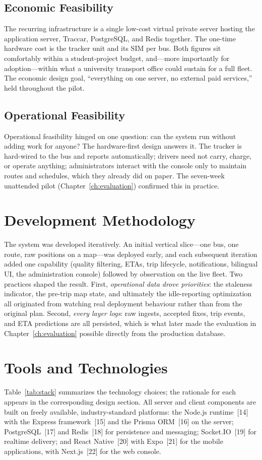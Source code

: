 \subsection{Economic Feasibility}
The recurring infrastructure is a single low-cost virtual private server
hosting the application server, Traccar, PostgreSQL, and Redis together.
The one-time hardware cost is the tracker unit and its SIM per bus. Both
figures sit comfortably within a student-project budget, and---more
importantly for adoption---within what a university transport office
could sustain for a full fleet. The economic design goal, ``everything on
one server, no external paid services,'' held throughout the pilot.

\subsection{Operational Feasibility}
Operational feasibility hinged on one question: can the system run
without adding work for anyone? The hardware-first design answers it. The
tracker is hard-wired to the bus and reports automatically; drivers need
not carry, charge, or operate anything; administrators interact with the
console only to maintain routes and schedules, which they already did on
paper. The seven-week unattended pilot (Chapter~\ref{ch:evaluation})
confirmed this in practice.

\section{Development Methodology}
The system was developed iteratively. An initial vertical slice---one
bus, one route, raw positions on a map---was deployed early, and each
subsequent iteration added one capability (quality filtering, ETAs, trip
lifecycle, notifications, bilingual UI, the administration console)
followed by observation on the live fleet. Two practices shaped the
result. First, \emph{operational data drove priorities}: the staleness
indicator, the pre-trip map state, and ultimately the idle-reporting
optimization all originated from watching real deployment behaviour
rather than from the original plan. Second, \emph{every layer logs}: raw
ingests, accepted fixes, trip events, and ETA predictions are all
persisted, which is what later made the evaluation in
Chapter~\ref{ch:evaluation} possible directly from the production
database.

\section{Tools and Technologies}
Table~\ref{tab:stack} summarizes the technology choices; the rationale
for each appears in the corresponding design section. All server and
client components are built on freely available, industry-standard
platforms: the Node.js runtime~[14] with the Express framework~[15] and
the Prisma ORM~[16] on the server; PostgreSQL~[17] and Redis~[18] for
persistence and messaging; Socket.IO~[19] for realtime delivery; and
React Native~[20] with Expo~[21] for the mobile applications, with
Next.js~[22] for the web console.

